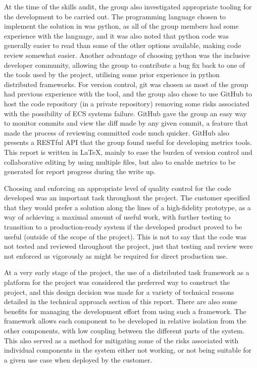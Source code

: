 At the time of the skills audit, the group also investigated appropriate tooling
for the development to be carried out. The programming language chosen to implement the
solution in was python, as all of the group members had some experience
with the language, and it was also noted that python code was generally easier to
read than some of the other options available, making code review somewhat
easier. Another advantage of choosing python was the inclusive developer
community, allowing the group to contribute a bug fix back to one of
the tools used by the project, utilising some prior experience in python distributed
frameworks.
For version control, git was chosen as most of the group had previous experience
with the tool, and the group also chose to use GitHub to host the code
repository (in a private repository) removing some risks associated with the
possibility of ECS systems failure. GitHub gave the group an easy way to monitor
commits and view the diff made by any given commit, a feature that made the
process of reviewing committed code much quicker. GitHub also presents a
RESTful API that the group
found useful for developing metrics tools. This report is written in LaTeX,
mainly to ease the burden of version control and collaborative editing by using
multiple files, but also to enable metrics to be generated for report progress
during the write up.

Choosing and enforcing an appropriate level of quality control for the code
developed was an important task throughout the project. The customer specified
that they would prefer a solution along the lines of a high-fidelity prototype,
as a way of achieving a maximal amount of useful work, with further testing to transition
to a production-ready system if the developed product proved to be useful
(outside of the scope of the project). This
is not to say that the code was not tested and reviewed throughout the project,
just that testing and review were not enforced as vigorously as might be
required for direct production use.

At a very early stage of the project, the use of a distributed task framework as
a platform for the project was considered the preferred way to construct the
project, and this design decision was made for a variety of technical reasons
detailed in the technical approach section of this report. There are also some
benefits for managing the development effort from using such a framework. The
framework allows each component to be developed in relative isolation from the
other components, with low coupling between the different parts of the system.
This also served as a method for mitigating some of the risks associated with
individual components in the system either not working, or not being suitable
for a given use case when deployed by the customer.

